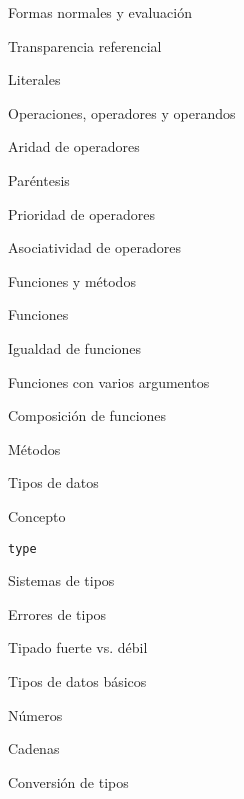 \begin{longenum}
\begin{longenum}
\begin{longenum}
\begin{longenum}
                \item Formas normales y evaluación
                \item Transparencia referencial
            \end{longenum}
            \item Literales
            \item Operaciones, operadores y operandos
            \begin{longenum}
                \item Aridad de operadores
                \item Paréntesis
                \item Prioridad de operadores
                \item Asociatividad de operadores
            \end{longenum}
            \item Funciones y métodos
            \begin{longenum}
                \item Funciones
                \item Igualdad de funciones
                \item Funciones con varios argumentos
                \item Composición de funciones
                \item Métodos
            \end{longenum}
        \end{longenum}
        \item Tipos de datos
        \begin{longenum}
            \item Concepto
            \item \texttt{type}
            \item Sistemas de tipos
            \begin{longenum}
                \item Errores de tipos
                \item Tipado fuerte vs. débil
            \end{longenum}
            \item Tipos de datos básicos
            \begin{longenum}
                \item Números
                \item Cadenas
            \end{longenum}
            \item Conversión de tipos

\end{longenum}
\end{longenum}
\end{longenum}
